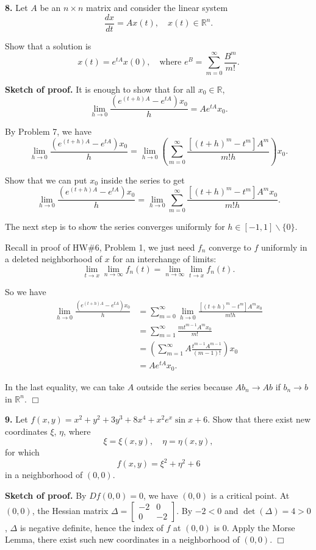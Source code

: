 \documentclass{article}
\begin{document}
    \textbf{8.} Let $A$ be an $n \times n$ matrix and consider the linear
system \[\frac{dx}{dt}= Ax(t),\quad x(t) \in \mathbb{R}^n.\]

Show that a solution is
\[x(t) = e^{tA} x(0),\quad \text{where }e^B =\sum_{m=0}^{\infty}\frac{B^m}{m!}.\]

    \textbf{Sketch of proof.} It is enough to show that for all
$x_0 \in \mathbb{R}$,
\[\tag{*}\lim_{h\to 0} \frac{(e^{(t+h)A}-e^{tA})x_0}{h} = Ae^{tA}x_0.\]

By Problem 7, we have
\[\lim_{h\to 0} \frac{(e^{(t+h)A}-e^{tA})x_0}{h} = \lim_{h\to 0} \left(\sum_{m=0}^{\infty}\frac{[(t+h)^m-t^m]A^m}{m!h}\right)x_0.\]

Show that we can put $x_0$ inside the series to get
\[\lim_{h\to 0} \frac{(e^{(t+h)A}-e^{tA})x_0}{h} = \lim_{h\to 0} \sum_{m=0}^{\infty}\frac{[(t+h)^m-t^m]A^mx_0}{m!h}.\]

The next step is to show the series converges uniformly for
$h\in [-1,1]\backslash \{0\}$.

Recall in proof of HW\#6, Problem 1, we just need $f_n$ converge to $f$
uniformly in a deleted neighborhood of $x$ for an interchange of limits:
\[ \lim_{t\to x}\lim_{n\to\infty} f_n(t) = \lim_{n\to \infty}\lim_{t\to x}f_n(t).\]

So we have \[\begin{aligned}
\lim_{h\to 0} \frac{(e^{(t+h)A}-e^{tA})x_0}{h} &=  \sum_{m=0}^{\infty}\lim_{h\to 0}\frac{[(t+h)^m-t^m]A^mx_0}{m!h}\\
&= \sum_{m=1}^{\infty} \frac{mt^{m-1}A^m x_0}{m!}\\
& = \left(\sum_{m=1}^{\infty} A\frac{t^{m-1}A^{m-1}}{(m-1)!}\right)x_0\\
& = A e^{tA}x_0.
\end{aligned}\]

In the last equality, we can take $A$ outside the series because
$Ab_n \to Ab$ if $b_n \to b$ in $\mathbb{R}^n$. $\Box$

    \textbf{9.} Let
$f (x, y) = x^2 + y^2 + 3y^3 + 8x^4 + x^2 e^x \sin x + 6$. Show that
there exist new coordinates $\xi$, $\eta$, where
\[\xi = \xi(x, y),\quad \eta = \eta(x, y),\] for which
\[f (x, y) = \xi^2 + \eta^2 + 6\] in a neighborhood of $(0, 0)$.

    \textbf{Sketch of proof.} By $Df(0,0) = 0$, we have $(0,0)$ is a
critical point. At $(0,0)$, the Hessian matrix
$\Delta = \begin{bmatrix}-2 & 0 \\ 0 & -2 \end{bmatrix}$. By $-2 < 0$
and $\det (\Delta) = 4 > 0$, $\Delta$ is negative definite, hence the
index of $f$ at $(0,0)$ is $0$. Apply the Morse Lemma, there exist such
new coordinates in a neighborhood of $(0,0)$. $\Box$
\end{document}
